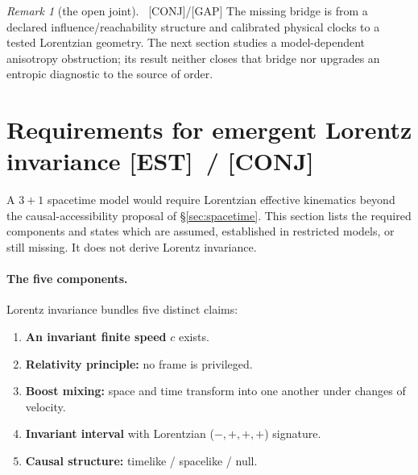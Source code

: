 \documentclass[11pt]{article}
\newcommand{\est}{\textcolor{teal!70!black}{\textsf{\small[EST]}}}
\newcommand{\fields}{\textcolor{violet}{\textsf{\small[FIELDS]}}}
\newcommand{\asm}{\textcolor{blue!70!black}{\textsf{\small[ASM]}}}
\newcommand{\conj}{\textcolor{orange!80!black}{\textsf{\small[CONJ]}}}
\newcommand{\post}{\textcolor{purple!70!black}{\textsf{\small[POST]}}}
\newcommand{\gap}{\textcolor{red!75!black}{\textsf{\small[GAP]}}}
\def\est{[EST]}\def\fields{[FIELDS]}\def\asm{[ASM]}%
\def\conj{[CONJ]}\def\post{[POST]}\def\gap{[GAP]}%
\def\quad{ }\def\normalsize{}%
\theoremstyle{definition}
\theoremstyle{remark}
\newtheorem*{remark}{Remark}
\begin{document}
\begin{remark}[the open joint]{\normalfont\ \conj/\gap}
The missing bridge is from a declared influence/reachability structure and calibrated physical clocks to a tested Lorentzian geometry. The next section studies a model-dependent anisotropy obstruction; its result neither closes that bridge nor upgrades an entropic diagnostic to the source of order.
\end{remark}

\section{Requirements for emergent Lorentz invariance \quad{\normalsize\est\ / \conj}\label{sec:lorentz}}

A $3{+}1$ spacetime model would require Lorentzian effective kinematics beyond the causal-accessibility proposal of \S\ref{sec:spacetime}. This section lists the required components and states which are assumed, established in restricted models, or still missing. It does not derive Lorentz invariance.

\paragraph{The five components.}
Lorentz invariance bundles five distinct claims:
\begin{enumerate}[leftmargin=1.6em, itemsep=1pt, topsep=2pt]
  \item[\textbf{C1}] \textbf{An invariant finite speed} $c$ exists.
  \item[\textbf{C2}] \textbf{Relativity principle:} no frame is privileged.
  \item[\textbf{C3}] \textbf{Boost mixing:} space and time transform into one another under changes of velocity.
  \item[\textbf{C4}] \textbf{Invariant interval} with Lorentzian ($-,+,+,+$) signature.
  \item[\textbf{C5}] \textbf{Causal structure:} timelike / spacelike / null.
\end{enumerate}
\end{document}
